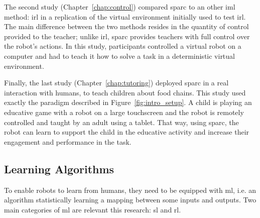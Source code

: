 The second study (Chapter~\ref{chap:control}) compared \gls{sparc} to an other \gls{iml} method: \gls{irl} in a replication of the virtual environment initially used to test \gls{irl}. The main difference between the two methods resides in the quantity of control provided to the teacher; unlike \gls{irl}, \gls{sparc} provides teachers with full control over the robot's actions. In this study, participants controlled a virtual robot on a computer and had to teach it how to solve a task in a deterministic virtual environment.

Finally, the last study (Chapter~\ref{chap:tutoring}) deployed \gls{sparc} in a real interaction with humans, to teach children about food chains. This study used exactly the paradigm described in Figure~\ref{fig:intro_setup}. A child is playing an educative game with a robot on a large touchscreen and the robot is remotely controlled and taught by an adult using a tablet. That way, using \gls{sparc}, the robot can learn to support the child in the educative activity and increase their engagement and performance in the task.

%
%
%
%
%

\subsection{Learning Algorithms}
To enable robots to learn from humans, they need to be equipped with \acrfull{ml}, i.e. an algorithm statistically learning a mapping between some inputs and outputs. Two main categories of \gls{ml} are relevant this research: \gls{sl} and \gls{rl}.

